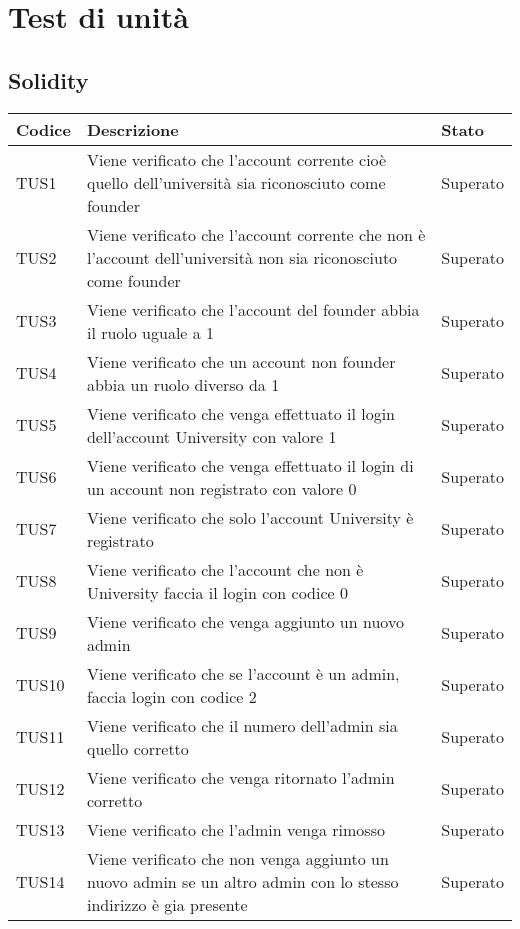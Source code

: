 \documentclass[PianoDiQualifica.tex]{subfiles}
\begin{document}
\chapter{Test di unità}
\section{Solidity}
\begin{longtable}[H]{P{2cm}P{8.5cm}P{3cm}}
	\color{CHeaderText}\textbf{Codice} & 
	\color{CHeaderText}\textbf{Descrizione} & 
	\color{CHeaderText}\textbf{Stato}\\
	\endhead
	TUS1 & Viene verificato che l'account corrente cioè quello dell'università sia riconosciuto come founder & Superato \\ 
	TUS2 & Viene verificato che l'account corrente che non è l'account dell'università non sia riconosciuto come founder & Superato \\
	TUS3 & Viene verificato che l'account del founder abbia il ruolo uguale a 1 & Superato \\
	TUS4 & Viene verificato che un account non founder abbia un ruolo diverso da 1 & Superato \\
	TUS5 & Viene verificato che venga effettuato il login dell'account University con valore 1 & Superato \\
	TUS6 & Viene verificato che venga effettuato il login di un account non registrato con valore 0 & Superato \\
	TUS7 & Viene verificato che solo l'account University è registrato & Superato \\
	TUS8 & Viene verificato che l'account che non è University faccia il login con codice 0 & Superato \\
	TUS9 & Viene verificato che venga aggiunto un nuovo admin & Superato\\
	TUS10 & Viene verificato che se l'account è un admin, faccia login con codice 2 & Superato \\
	TUS11 & Viene verificato che il numero dell'admin sia quello corretto & Superato \\
	TUS12 & Viene verificato che venga ritornato l'admin corretto & Superato \\
	TUS13 & Viene verificato che l'admin venga rimosso & Superato \\
	TUS14 & Viene verificato che non venga aggiunto un nuovo admin se un altro admin con lo stesso indirizzo è gia presente & Superato \\

\end{longtable}
\end{document}
